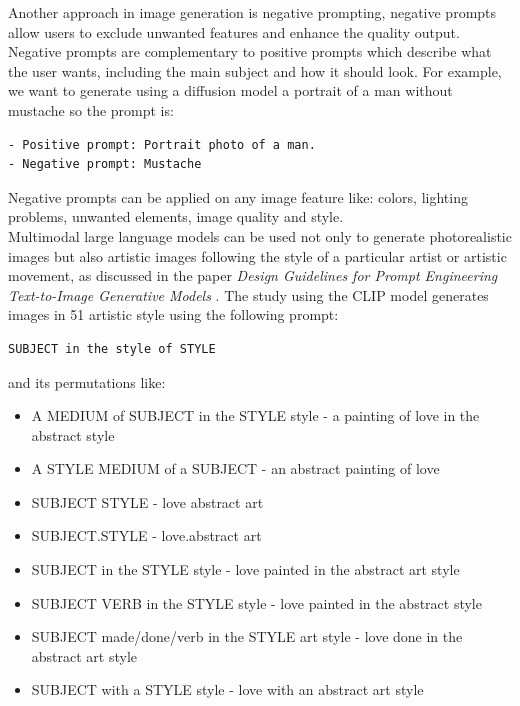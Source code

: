 Another approach in image generation is negative prompting, negative prompts allow users to exclude unwanted features and enhance the quality output.
Negative prompts are complementary to  positive prompts which describe what the user wants, including the main subject and how it should look.\cite{medium_negative}
For example, we want to generate using a diffusion model a portrait of a man without mustache so the prompt is:
\begin{lstlisting}
- Positive prompt: Portrait photo of a man.
- Negative prompt: Mustache
\end{lstlisting}
Negative prompts can be applied on any image feature like: colors, lighting problems, unwanted elements, image quality and style.\\
Multimodal large language models can be used not only to generate photorealistic images but also artistic images following the style of a particular artist or artistic movement, as discussed in the paper \textit{Design Guidelines for Prompt Engineering Text-to-Image Generative Models} \cite{liu2022design}. The study using the CLIP model generates images in 51 artistic style using the following prompt:
\begin{lstlisting}
SUBJECT in the style of STYLE
\end{lstlisting}
and its permutations like:
\begin{itemize}
    \item A MEDIUM of SUBJECT in the STYLE style - a painting of love in the abstract style

    \item A STYLE MEDIUM of a SUBJECT - an abstract painting of love

    \item SUBJECT STYLE - love abstract art

    \item SUBJECT.STYLE - love.abstract art

    \item SUBJECT in the STYLE style - love painted in the abstract art style

    \item SUBJECT VERB in the STYLE style - love painted in the abstract style

    \item SUBJECT made/done/verb in the STYLE art style - love done in the abstract art style

    \item SUBJECT with a STYLE style - love with an abstract art style
\end{itemize}

